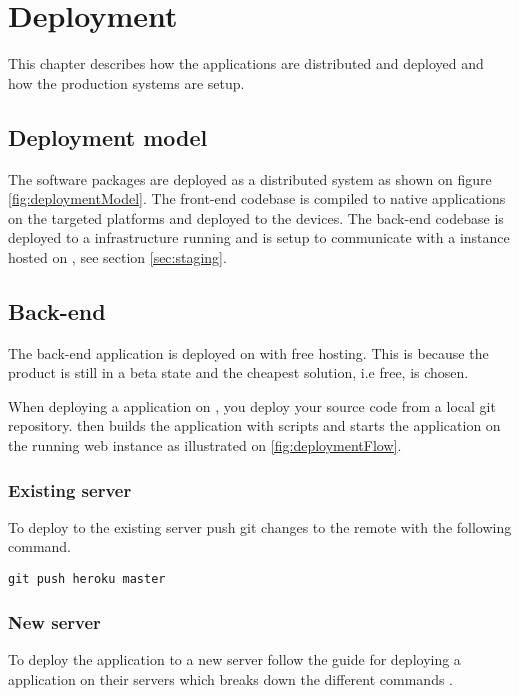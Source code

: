 \chapter{Deployment}
This chapter describes how the applications are distributed and deployed and how the production systems are setup.

\section{Deployment model}
The software packages are deployed as a distributed system as shown on figure \ref{fig:deploymentModel}.
The front-end codebase is compiled to native applications on the targeted platforms and deployed to the devices.
The back-end codebase is deployed to a  infrastructure running  and is setup to communicate with a  instance hosted on , see section \ref{sec:staging}.


\section{Back-end}
The back-end application is deployed on  with free hosting. 
This is because the product is still in a beta state and the cheapest solution, i.e free, is chosen.

When deploying a  application on , you deploy your source code from a local git repository.
 then builds the application with  scripts and starts the application on the running web instance as illustrated on \ref{fig:deploymentFlow}.


\subsection{Existing server}
To deploy to the existing server push git changes to the  remote with the following command.

\verb+git push heroku master+

\subsection{New server}
\label{sec:deployment:new}
To deploy the application to a new server follow the  guide for deploying a  application on their servers which breaks down the different commands \citep{documentation:deployment:heroku}.

